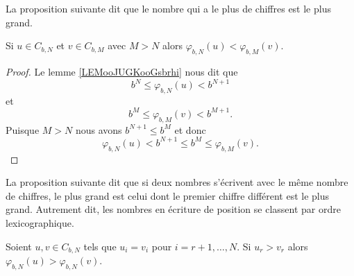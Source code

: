 La proposition suivante dit que le nombre qui a le plus de chiffres est le plus grand.
\begin{proposition}
	Si \( u\in C_{b,N}\) et \( v\in C_{b,M}\) avec \( M>N\) alors \( \varphi_{b,N}(u)<\varphi_{b,M}(v)\).
\end{proposition}

\begin{proof}
	Le lemme  \ref{LEMooJUGKooGsbrhi} nous dit que
	\begin{equation}
		b^N\leq \varphi_{b,N}(u)< b^{N+1}
	\end{equation}
	et
	\begin{equation}
		b^M\leq \varphi_{b,M}(v)< b^{M+1}.
	\end{equation}
	Puisque \( M>N\) nous avons \( b^{N+1}\leq b^M\) et donc
	\begin{equation}
		\varphi_{b,N}(u)< b^{N+1}\leq b^M\leq \varphi_{b,M}(v).
	\end{equation}
\end{proof}

La proposition suivante dit que si deux nombres s'écrivent avec le même nombre de chiffres, le plus grand est celui dont le premier chiffre différent est le plus grand. Autrement dit, les nombres en écriture de position se classent par ordre lexicographique.

\begin{proposition}
	Soient \( u,v\in C_{b,N}\) tels que \( u_i=v_i\) pour \( i=r+1,\ldots, N\). Si \( u_r>v_r\) alors \( \varphi_{b,N}(u)>\varphi_{b,N}(v)\).
\end{proposition}

